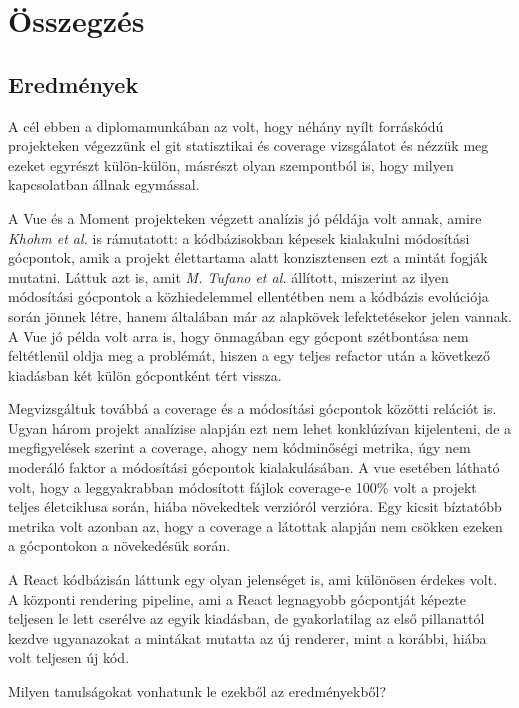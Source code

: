 \chapter{Összegzés}
\label{ch:sum}

\section{Eredmények}

A cél ebben a diplomamunkában az volt, hogy néhány nyílt forráskódú projekteken végezzünk el git statisztikai és coverage vizsgálatot és nézzük meg ezeket egyrészt külön-külön, másrészt olyan szempontból is, hogy milyen kapcsolatban állnak egymással.

A Vue és a Moment projekteken végzett analízis jó példája volt annak, amire \textit{Khohm et al.}\cite{khomh} is rámutatott: a kódbázisokban képesek kialakulni módosítási gócpontok, amik a projekt élettartama alatt konzisztensen ezt a mintát fogják mutatni. Láttuk azt is, amit \textit{M. Tufano et al.}\cite{codeSmells} állított, miszerint az ilyen módosítási gócpontok a közhiedelemmel ellentétben nem a kódbázis evolúciója során jönnek létre, hanem általában már az alapkövek lefektetésekor jelen vannak.
A Vue jó példa volt arra is, hogy önmagában egy gócpont szétbontása nem feltétlenül oldja meg a problémát, hiszen a  egy teljes refactor után a következő kiadásban két külön gócpontként tért vissza.

Megvizsgáltuk továbbá a coverage és a módosítási gócpontok közötti relációt is. Ugyan három projekt analízise alapján ezt nem lehet konklúzívan kijelenteni, de a megfigyelések szerint a coverage, ahogy nem kódminőségi metrika, úgy nem moderáló faktor a módosítási gócpontok kialakulásában. A vue esetében látható volt, hogy a leggyakrabban módosított fájlok coverage-e 100\% volt a projekt teljes életciklusa során, hiába növekedtek verzióról verzióra. Egy kicsit bíztatóbb metrika volt azonban az, hogy a coverage a látottak alapján nem csökken ezeken a gócpontokon a növekedésük során.

A React kódbázisán láttunk egy olyan jelenséget is, ami különösen érdekes volt. A központi rendering pipeline, ami a React legnagyobb gócpontját képezte teljesen le lett cserélve az egyik kiadásban, de gyakorlatilag az első pillanattól kezdve ugyanazokat a mintákat mutatta az új renderer, mint a korábbi, hiába volt teljesen új kód.

Milyen tanulságokat vonhatunk le ezekből az eredményekből?

